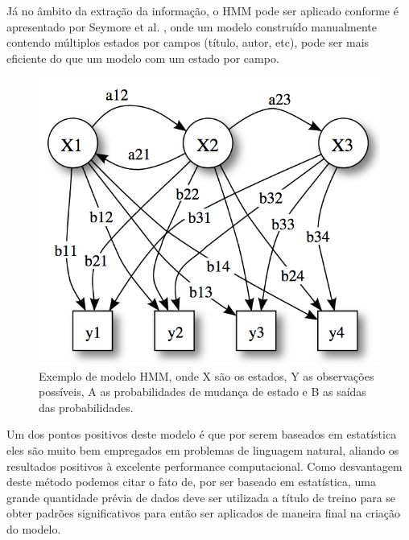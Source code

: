 Já no âmbito da extração da informação, o HMM pode ser aplicado conforme é apresentado por Seymore et al. \cite{Seymore-HMM-IE}, onde um modelo construído manualmente contendo múltiplos estados por campos (título, autor, etc), pode ser mais eficiente do que um modelo com um estado por campo. 


\begin{figure}
\centering
\caption{Exemplo de modelo HMM, onde X são os estados, Y as observações possíveis, A as probabilidades de mudança de estado e B as saídas das probabilidades.}
\label{fig:hmm-states}
\includegraphics[width=0.7\linewidth]{./assets/hmm-states}
\end{figure}

\begin{textoalterado}
Um dos pontos positivos deste modelo é que por serem baseados em estatística eles são muito bem empregados em problemas de linguagem natural, aliando os resultados positivos à excelente performance computacional. Como desvantagem deste método podemos citar o fato de, por ser baseado em estatística, uma grande quantidade prévia de dados deve ser utilizada a título de treino para se obter padrões significativos para então ser aplicados de maneira final na criação do modelo.
\end{textoalterado}

